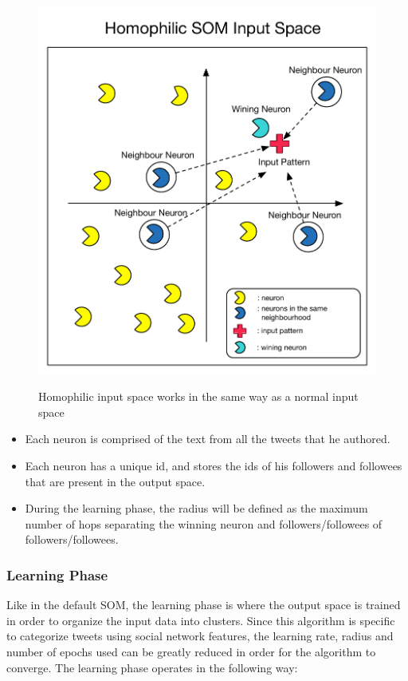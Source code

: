 \documentclass[journal]{IEEEtran}
\begin{document}
\begin{figure}[h]
  \centering
  \includegraphics[width=0.6\linewidth]{./images/homophilic_input_space.pdf}
  \label{chp3:homin}
  \caption{ Homophilic input space works in the same way as a normal input space}
\end{figure}

\begin{itemize}
  \item Each neuron is comprised of the text from all the tweets that he authored.
  \item Each neuron has a unique id, and stores the ids of his followers and followees that are present in the output space.
  \item During the learning phase, the radius will be defined as the maximum number of hops separating the winning neuron and followers/followees of followers/followees. 
\end{itemize}


\subsubsection{Learning Phase}
\label{sub:learning_phase}
Like in the default \ac{SOM}, the learning phase is where the output space is trained in order to organize the input data into clusters. Since this algorithm is specific to categorize tweets using social network features, the learning rate, radius and number of epochs used can be greatly reduced in order for the algorithm to converge. The learning phase operates in the following way:
\end{document}
